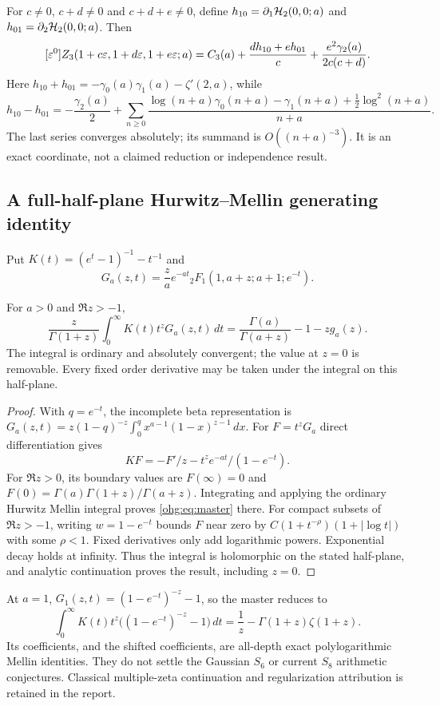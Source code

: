 For $c\ne0$, $c+d\ne0$ and $c+d+e\ne0$, define
$h_{10}=\partial_1\mathcal H_2(0,0;a)$ and
$h_{01}=\partial_2\mathcal H_2(0,0;a)$. Then
\begin{equation}\label{ohg:eq:triple}
 [\varepsilon^0]Z_3(1+c\varepsilon,1+d\varepsilon,1+e\varepsilon;a)
 =C_3(a)+\frac{d h_{10}+e h_{01}}c
             +\frac{e^2\gamma_2(a)}{2c(c+d)}.
\end{equation}
Here $h_{10}+h_{01}=-\gamma_0(a)\gamma_1(a)-\zeta'(2,a)$, while
\begin{equation}\label{ohg:eq:omega}
 h_{10}-h_{01}=-\frac{\gamma_2(a)}2+
 \sum_{n\ge0}\frac{\log(n+a)\gamma_0(n+a)-\gamma_1(n+a)
                         +\tfrac12\log^2(n+a)}{n+a}.
\end{equation}
The last series converges absolutely; its summand is $O((n+a)^{-3})$.
It is an exact coordinate, not a claimed reduction or independence result.

\subsection{A full-half-plane Hurwitz--Mellin generating identity}
\label{ohg:sec:mellin}
Put $K(t)=(e^t-1)^{-1}-t^{-1}$ and
\[
 G_a(z,t)=\frac za e^{-at}{}_2F_1(1,a+z;a+1;e^{-t}).
\]
\begin{theorem}
\label{ohg:thm:master}
For $a>0$ and $\Re z>-1$,
\begin{equation}\label{ohg:eq:master}
 \frac z{\Gamma(1+z)}\int_0^\infty K(t)t^zG_a(z,t)\,dt
 =\frac{\Gamma(a)}{\Gamma(a+z)}-1-zg_a(z).
\end{equation}
The integral is ordinary and absolutely convergent; the value at $z=0$
is removable. Every fixed order derivative may be taken under the
integral on this half-plane.
\end{theorem}
\begin{proof}
With $q=e^{-t}$, the incomplete beta representation is
$G_a(z,t)=z(1-q)^{-z}\int_0^q x^{a-1}(1-x)^{z-1}\,dx$.
For $F=t^zG_a$ direct differentiation gives
\[
 KF=-F'/z-t^ze^{-at}/(1-e^{-t}).
\]
For $\Re z>0$, its boundary values are $F(\infty)=0$ and
$F(0)=\Gamma(a)\Gamma(1+z)/\Gamma(a+z)$. Integrating and applying the
ordinary Hurwitz Mellin integral proves \eqref{ohg:eq:master} there.
For compact subsets of $\Re z>-1$, writing $w=1-e^{-t}$ bounds $F$
near zero by $C(1+t^{-\rho})(1+|\log t|)$ with some $\rho<1$.
Fixed derivatives only add logarithmic powers. Exponential decay holds
at infinity. Thus the integral is holomorphic on the stated half-plane,
and analytic continuation proves the result, including $z=0$.
\end{proof}

At $a=1$, $G_1(z,t)=(1-e^{-t})^{-z}-1$, so the master reduces to
\[
 \int_0^\infty K(t)t^z\big((1-e^{-t})^{-z}-1\big)\,dt
 =\frac1z-\Gamma(1+z)\zeta(1+z).
\]
Its coefficients, and the shifted coefficients, are all-depth exact
polylogarithmic Mellin identities. They do not settle the Gaussian
$S_6$ or current $S_8$ arithmetic conjectures. Classical multiple-zeta
continuation and regularization attribution is retained in the report.
